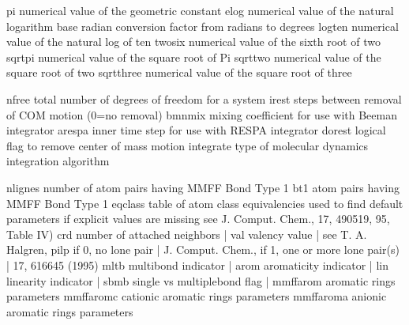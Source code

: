 \documentclass[letterpaper,11pt,english]{sphinxmanual}
\begin{document}

\begin{sphinxVerbatim}[commandchars=\\\{\}]
pi              numerical value of the geometric constant
elog            numerical value of the natural logarithm base
radian          conversion factor from radians to degrees
logten          numerical value of the natural log of ten
twosix          numerical value of the sixth root of two
sqrtpi          numerical value of the square root of Pi
sqrttwo         numerical value of the square root of two
sqrtthree       numerical value of the square root of three
\end{sphinxVerbatim}


\begin{sphinxVerbatim}[commandchars=\\\{\}]
nfree           total number of degrees of freedom for a system
irest           steps between removal of COM motion (0=no removal)
bmnmix          mixing coefficient for use with Beeman integrator
arespa          inner time step for use with RESPA integrator
dorest          logical flag to remove center of mass motion
integrate       type of molecular dynamics integration algorithm
\end{sphinxVerbatim}


\begin{sphinxVerbatim}[commandchars=\\\{\}]
nlignes         number of atom pairs having MMFF Bond Type 1
bt\PYGZus{}1            atom pairs having MMFF Bond Type 1
eqclass         table of atom class equivalencies used to find
default         parameters if explicit values are missing
see             J. Comput. Chem., 17, 490\PYGZhy{}519, \PYGZsq{}95, Table IV)
crd             number of attached neighbors    |
val             valency value                   |  see T. A. Halgren,
pilp            if 0, no lone pair              |  J. Comput. Chem.,
if              1, one or more lone pair(s)  |  17, 616\PYGZhy{}645 (1995)
mltb            multibond indicator             |
arom            aromaticity indicator           |
lin             linearity indicator             |
sbmb            single\PYGZhy{} vs multiple\PYGZhy{}bond flag   |
mmffarom        aromatic rings parameters
mmffaromc       cationic aromatic rings parameters
mmffaroma       anionic aromatic rings parameters
\end{sphinxVerbatim}
\end{document}
